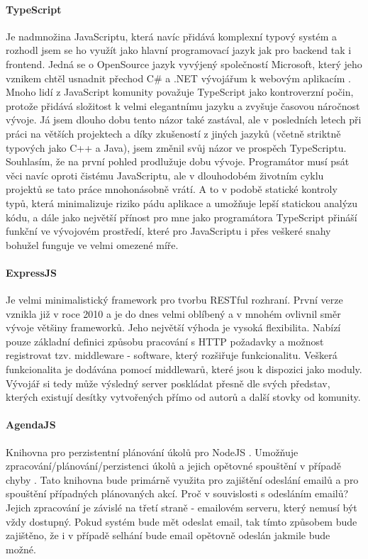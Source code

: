 \paragraph{TypeScript} Je nadmnožina JavaScriptu, která navíc přidává komplexní typový systém \cite{ts} a rozhodl jsem se ho využít jako hlavní programovací jazyk jak pro backend tak i frontend. Jedná se o OpenSource jazyk vyvýjený společností Microsoft, který jeho vznikem chtěl usnadnit přechod C\# a .NET vývojářum k webovým aplikacím \cite{ts}. Mnoho lidí z JavaScript komunity považuje TypeScript jako kontroverzní počin, protože přidává složitost k velmi elegantnímu jazyku a zvyšuje časovou náročnost vývoje. Já jsem dlouho dobu tento názor také zastával, ale v posledních letech při práci na větších projektech a díky zkušeností z jiných jazyků (včetně striktně typových jako C++ a Java), jsem změnil svůj názor ve prospěch TypeScriptu. Souhlasím, že na první pohled prodlužuje dobu vývoje. Programátor musí psát věci navíc oproti čistému JavaScriptu, ale v dlouhodobém životním cyklu projektů se tato práce  mnohonásobně vrátí. A to v podobě statické kontroly typů, která minimalizuje riziko pádu aplikace a umožňuje  lepší statickou analýzu kódu, a dále jako největší přínost pro mne jako programátora TypeScript přináší funkční  ve vývojovém prostředí, které pro JavaScriptu i přes veškeré snahy bohužel funguje ve velmi omezené míře.

\paragraph{ExpressJS}\label{expressjs} Je velmi minimalistický framework pro tvorbu RESTful rozhraní. První verze vznikla již v roce 2010 a je do dnes velmi oblíbený a v mnohém ovlivnil směr vývoje většiny frameworků. Jeho největší výhoda je vysoká flexibilita. Nabízí pouze základní definici způsobu pracování s HTTP požadavky a možnost registrovat tzv. middleware - software, který rozšiřuje funkcionalitu. Veškerá funkcionalita je dodávána pomocí middlewarů, které jsou k dispozici jako moduly. Vývojář si tedy může výsledný server poskládat přesně dle svých představ, kterých existují desítky vytvořených přímo od autorů a další stovky od komunity. \cite{expressjs}


\paragraph{AgendaJS} Knihovna pro perzistentní plánování úkolů pro NodeJS \cite{agendajs}. Umožňuje zpracování/plánování/perzistenci úkolů a jejich opětovné spouštění v případě chyby \cite{agendajs}. Tato knihovna bude primárně využita pro zajištění odeslání emailů a pro spouštění případných plánovaných akcí. Proč v souvislosti s odesláním emailů? Jejich zpracování je závislé na třetí straně - emailovém serveru, který nemusí být vždy dostupný. Pokud systém bude mět odeslat email, tak tímto způsobem bude zajištěno, že i v případě selhání bude email opětovně odeslán jakmile bude možné.

